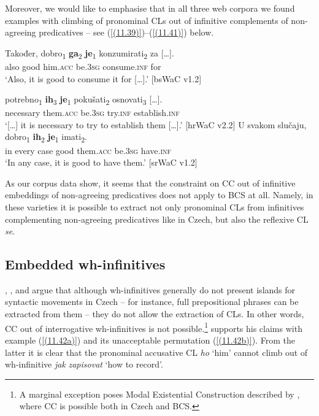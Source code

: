 \noindent Moreover, we would like to emphasise that in all three web corpora we found examples with climbing of pronominal CLs out of infinitive complements of non-agreeing predicatives – see (\ref{(11.39)})--(\ref{(11.41)}) below. 

\begin{exe}\ex\label{(11.39)}
\gll Također, dobro\textsubscript{1} \textbf{ga}\textsubscript{2} \textbf{je}\textsubscript{1} konzumirati\textsubscript{2} {za [\dots].} \\
 also good him.\textsc{acc} be.3\textsc{sg} consume.\textsc{inf} for \\
\glt ‘Also, it is good to consume it for [\dots].’
\hfill [bsWaC v1.2]

\ex\label{(11.40)}
\gll [\dots] potrebno\textsubscript{1} \textbf{ih}\textsubscript{3} \textbf{je}\textsubscript{1} pokušati\textsubscript{2} {osnovati\textsubscript{3} [\dots].} \\
 {} necessary them.\textsc{acc} be.3\textsc{sg} try.\textsc{inf} establish.\textsc{inf}\\
\glt ‘[\dots] it is necessary to try to establish them [\dots].’
\hfill [hrWaC v2.2]
\ex\label{(11.41)}
\gll U svakom slučaju, dobro\textsubscript{1} \textbf{ih}\textsubscript{2} \textbf{je}\textsubscript{1} imati\textsubscript{2}. \\
 in every case good them.\textsc{acc} be.3\textsc{sg} have.\textsc{inf} \\
\glt ‘In any case, it is good to have them.’
\hfill [srWaC v1.2]
\end{exe}

\noindent As our corpus data show, it seems that the constraint on CC out of infinitive embeddings of non-agreeing predicatives does not apply to BCS at all. Namely, in these varieties it is possible to extract not only pronominal CLs from infinitives complementing non-agreeing predicatives like in Czech, but also the reflexive CL \textit{se}. 

\subsection{Embedded wh-infinitives}
\label{Embedded wh-infinitives}

\citet[77]{Junghanns02}, \citet[83]{Dotlacil04}, and \citet[8, 9]{Rezac05} argue that although wh-infinitives generally do not present islands for syntactic movements in Czech – for instance, full prepositional phrases can be extracted from them – they do not allow the extraction of CLs. In other words, CC out of interrogative wh-infinitives is not possible.\footnote{A marginal exception poses Modal Existential Construction described by \citet{simik11}, where CC is possible both in Czech and BCS.} \citet[77]{Junghanns02} supports his claims with example (\ref{(11.42a)}) and its unacceptable permutation (\ref{(11.42b)}). From the latter it is clear that the pronominal accusative CL \textit{ho} ‘him’ cannot climb out of wh-infinitive \textit{jak} \textit{zapisovat} ‘how to record’.

